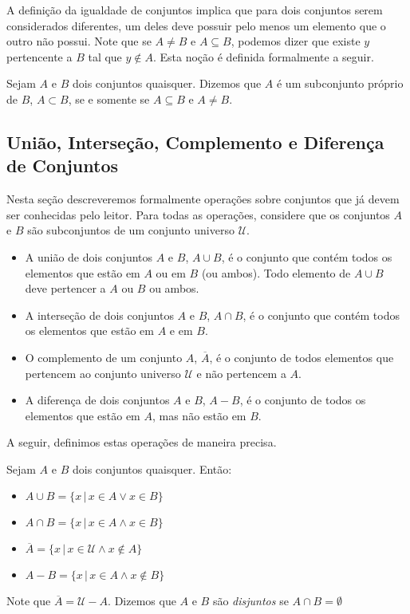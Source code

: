 A definição da igualdade de conjuntos implica que  para dois conjuntos
serem considerados diferentes, um deles deve possuir pelo menos um
elemento que o outro não possui. Note que se $A \neq B$ e $A\subseteq
B$, podemos dizer que existe $y$ pertencente a $B$ tal que $y\not\in
A$. Esta noção é definida formalmente a seguir.

\begin{Definition}
Sejam $A$ e $B$ dois conjuntos quaisquer. Dizemos que $A$ é um
subconjunto próprio de $B$, $A\subset B$, se e somente se $A\subseteq
B$ e $A \neq B$.
\end{Definition}

\subsection{União, Interseção, Complemento e Diferença de Conjuntos}

Nesta seção descreveremos formalmente operações sobre conjuntos que já devem ser
conhecidas pelo leitor. Para todas as operações, considere que os
conjuntos $A$ e $B$ são subconjuntos de um conjunto universo $\mathcal{U}$.
\begin{itemize}
  \item A união de dois conjuntos $A$ e $B$, $A\cup B$, é o conjunto
    que contém todos os elementos que estão em $A$ ou em $B$ (ou
    ambos). Todo elemento de $A\cup B$ deve pertencer a $A$ ou $B$ ou
    ambos.
  \item A interseção de dois conjuntos $A$ e $B$, $A\cap B$, é o
    conjunto que contém todos os elementos que estão em $A$ e em $B$.
  \item O complemento de um conjunto $A$, $\overline{A}$, é o conjunto
    de todos elementos que pertencem ao conjunto universo
    $\mathcal{U}$ e não pertencem a $A$.
  \item A diferença de dois conjuntos $A$ e $B$, $A - B$, é o conjunto
    de todos os elementos que estão em $A$, mas não estão em $B$.
\end{itemize}

A seguir, definimos estas operações de maneira precisa.

\begin{Definition}
Sejam $A$ e $B$ dois conjuntos quaisquer. Então:
\begin{itemize}
  \item $A\cup B = \{x \,|\, x\in A \lor x \in B\}$
  \item $A\cap B = \{x \,|\, x\in A \land x \in B\}$
  \item $\overline{A} = \{x\,|\,x\in\mathcal{U}\land x\not\in A\}$
  \item $A - B = \{x \,|\, x\in A \land x \not\in B\}$
\end{itemize}
Note que $\overline{A} = \mathcal{U} - A$. Dizemos que $A$ e $B$ são
\emph{disjuntos} se $A\cap B = \emptyset$
\end{Definition}

